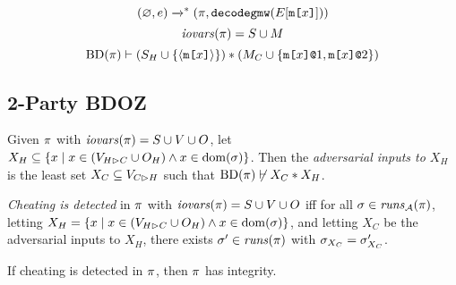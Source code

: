 \begin{lemma}
  $$ (\varnothing,e) \xrightarrow{}^{*} (\pi,\texttt{decodegmw}(E[\texttt{m[}x\texttt{]}])) $$
  $$\mathit{iovars}(\pi) = S \cup M$$
  $$\mathrm{BD}(\pi) \vdash (S_H \cup \{ \langle \texttt{m[}x\texttt{]} \rangle \}) * (M_C \cup \{ \texttt{m[}x\texttt{]}\texttt{@}1, \texttt{m[}x\texttt{]}\texttt{@}2 \})$$
\end{lemma}


\subsection{2-Party BDOZ}



\begin{definition}
  Given $\pi$ with $\mathit{iovars}(\pi) = S \cup V \cup O$,
  let $X_H \subseteq \{ x \mid x \in (V_{H \rhd C} \cup O_H) \wedge x \in \mathrm{dom}(\sigma) \}$.
  Then the \emph{adversarial inputs to $X_H$} is the least set
  $X_C \subseteq V_{C \rhd H}$ such that $\mathrm{BD}(\pi) \not\vdash X_C * X_H$.
\end{definition}
\begin{definition}
  \emph{Cheating is detected} in $\pi$ with $\mathit{iovars}(\pi) = S \cup V \cup O$ iff
  for all  $\sigma \in \mathit{runs}_{\mathcal{A}}(\pi)$,
  letting $X_H = \{ x \mid x \in (V_{H \rhd C} \cup O_H) \wedge x \in \mathrm{dom}(\sigma) \}$,
  and letting $X_C$ be the adversarial inputs to $X_H$,
  there exists $\sigma'\in \mathit{runs}(\pi)$
  with $\sigma_{X_C} = \sigma'_{X_C}$.  
\end{definition}

\begin{lemma}
  If cheating is detected in $\pi$, then $\pi$ has integrity.
\end{lemma}
